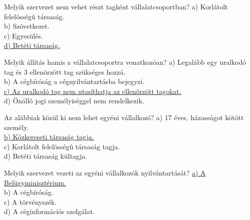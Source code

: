 \begin{frame}

\begin{tcolorbox}[title={83. Kérdés}]
Melyik szervezet nem vehet részt tagként vállalatcsoportban?
\tcblower
a) Korlátolt felelõsségû társaság.\\
b) Szövetkezet.\\
c) Egyesülés.\\
\uline {d) Betéti társaság.}
\end{tcolorbox}

\begin{tcolorbox}[title={84. Kérdés}]
Melyik állítás hamis a vállalatcsoportra vonatkozóan?
\tcblower
a) Legalább egy uralkodó tag és 3 ellenõrzött tag szükséges hozzá.\\
b) A cégbíróság a cégnyilvántartásba bejegyzi.\\
\uline {c) Az uralkodó tag nem utasíthatja az ellenõrzött tagokat.}\\
d) Önálló jogi személyiséggel nem rendelkezik.
\end{tcolorbox}

\begin{tcolorbox}[title={85. Kérdés}]
Az alábbiak közül ki nem lehet egyéni vállalkozó?
\tcblower
a) 17 éves, házasságot kötött személy.\\
\uline {b) Közkereseti társaság tagja.}\\
c) Korlátolt felelõsségû társaság tagja.\\
d) Betéti társaság kültagja.
\end{tcolorbox}

\begin{tcolorbox}[title={86. Kérdés}]
Melyik szervezet vezeti az egyéni vállalkozók nyilvántartását?
\tcblower
\uline {a) A Belügyminisztérium.}\\
b) A cégbíróság.\\
c) A törvényszék.\\
d) A céginformációs szolgálat.
\end{tcolorbox}

\end{frame}


